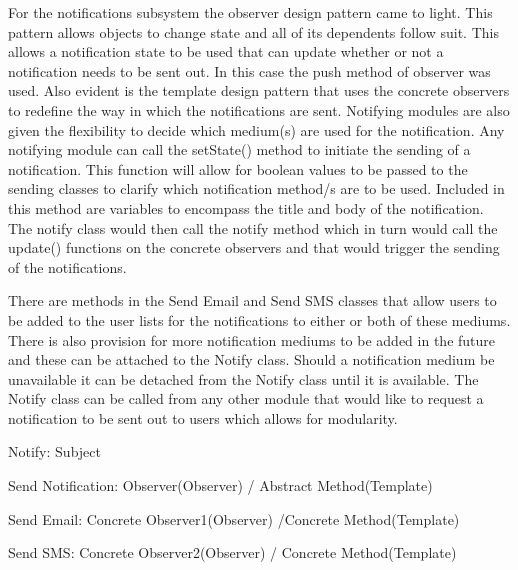 \documentclass{article}
\begin{document}
    
    \begin{flushleft}
    
        For the notifications subsystem the observer design pattern came to light. This pattern allows objects to change state and all of its dependents follow suit. This allows a notification state to be used that can update whether or not a notification needs to be sent out. In this case the push method of observer was used. Also evident is the template design pattern that uses the concrete observers to redefine the way in which the notifications are sent. Notifying modules are also given the flexibility to decide which medium(s) are used for the notification. Any notifying module can call the setState() method to initiate the sending of a notification. This function will allow for boolean values to be passed to the sending classes to clarify which notification method/s are to be used. Included in this method are variables to encompass the title and body of the notification. The notify class would then call the notify method which in turn would call the update() functions on the concrete observers and that would trigger the sending of the notifications.  
        
        \bigskip

        
        There are methods in the Send Email and Send SMS classes that allow users to be added to the user lists for the notifications to either or both of these mediums. There is also provision for more notification mediums to be added in the future and these can be attached to the Notify class. Should a notification medium be unavailable it can be detached from the Notify class until it is available. The Notify class can be called from any other module that would like to request a notification to be sent out to users which allows for modularity.
        
        
        \bigskip

        Notify: Subject
        

        Send Notification: Observer(Observer) / Abstract Method(Template)
        

        Send Email: Concrete Observer1(Observer) /Concrete Method(Template)
        

        Send SMS: Concrete Observer2(Observer) / Concrete Method(Template)
    
    \end{flushleft}
    
    \mbox{}\\
    \bigskip
  
\end{document}
